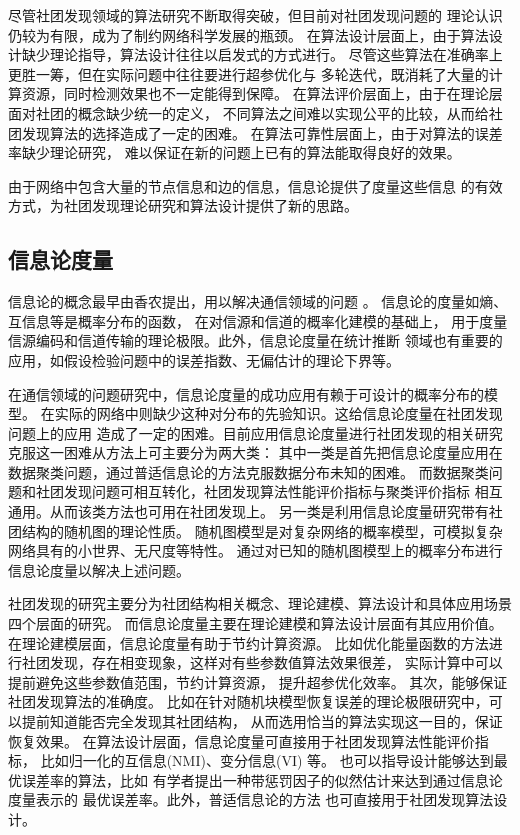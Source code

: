 
尽管社团发现领域的算法研究不断取得突破，但目前对社团发现问题的
理论认识仍较为有限，成为了制约网络科学发展的瓶颈。
在算法设计层面上，由于算法设计缺少理论指导，算法设计往往以启发式的方式进行。
尽管这些算法在准确率上更胜一筹，但在实际问题中往往要进行超参优化与
多轮迭代，既消耗了大量的计算资源，同时检测效果也不一定能得到保障。
在算法评价层面上，由于在理论层面对社团的概念缺少统一的定义，
不同算法之间难以实现公平的比较，从而给社团发现算法的选择造成了一定的困难。
在算法可靠性层面上，由于对算法的误差率缺少理论研究，
难以保证在新的问题上已有的算法能取得良好的效果。

由于网络中包含大量的节点信息和边的信息，信息论提供了度量这些信息
的有效方式，为社团发现理论研究和算法设计提供了新的思路。


\subsection{信息论度量}
信息论的概念最早由香农提出，用以解决通信领域的问题 \cite{shannon1948mathematical}。
信息论的度量如熵、互信息等是概率分布的函数，
在对信源和信道的概率化建模的基础上，
用于度量信源编码和信道传输的理论极限。此外，信息论度量在统计推断
领域也有重要的应用，如假设检验问题中的误差指数、无偏估计的理论下界等。


在通信领域的问题研究中，信息论度量的成功应用有赖于可设计的概率分布的模型。
在实际的网络中则缺少这种对分布的先验知识。这给信息论度量在社团发现问题上的应用
造成了一定的困难。目前应用信息论度量进行社团发现的相关研究克服这一困难从方法上可主要分为两大类：
其中一类是首先把信息论度量应用在数据聚类问题，通过普适信息论的方法克服数据分布未知的困难\cite{raman20219}。
而数据聚类问题和社团发现问题可相互转化，社团发现算法性能评价指标与聚类评价指标
相互通用。从而该类方法也可用在社团发现上。
另一类是利用信息论度量研究带有社团结构的随机图的理论性质。
随机图模型是对复杂网络的概率模型，可模拟复杂网络具有的小世界、无尺度等特性。
通过对已知的随机图模型上的概率分布进行信息论度量以解决上述问题。

社团发现的研究主要分为社团结构相关概念、理论建模、算法设计和具体应用场景四个层面的研究。
而信息论度量主要在理论建模和算法设计层面有其应用价值。
在理论建模层面，信息论度量有助于节约计算资源。
比如优化能量函数的方法进行社团发现，存在相变现象，这样对有些参数值算法效果很差，
实际计算中可以提前避免这些参数值范围，节约计算资源，
提升超参优化效率。
其次，能够保证社团发现算法的准确度。
比如在针对随机块模型恢复误差的理论极限研究中，可以提前知道能否完全发现其社团结构，
从而选用恰当的算法实现这一目的，保证恢复效果\cite{abbe2015community}。
在算法设计层面，信息论度量可直接用于社团发现算法性能评价指标，
比如归一化的互信息(NMI)\cite{Danon_2005}、变分信息(VI) \cite{2007Comparing}等。
也可以指导设计能够达到最优误差率的算法，比如
有学者提出一种带惩罚因子的似然估计来达到通过信息论度量表示的
最优误差率\cite{zhang2016}。此外，普适信息论的方法
也可直接用于社团发现算法设计\cite{ic2002, mim, app12094203}。


